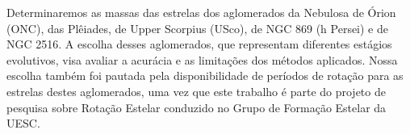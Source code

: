     Determinaremos as massas das estrelas dos aglomerados da Nebulosa de Órion (ONC), das Plêiades, de Upper Scorpius (USco), de NGC 869 (h Persei) e de NGC 2516. A escolha desses aglomerados, que representam diferentes estágios evolutivos, visa avaliar a acurácia e as limitações dos métodos aplicados. Nossa escolha também foi pautada pela disponibilidade de períodos de rotação para as estrelas destes aglomerados, uma vez que este trabalho é parte do projeto de pesquisa sobre Rotação Estelar conduzido no Grupo de Formação Estelar da UESC.
